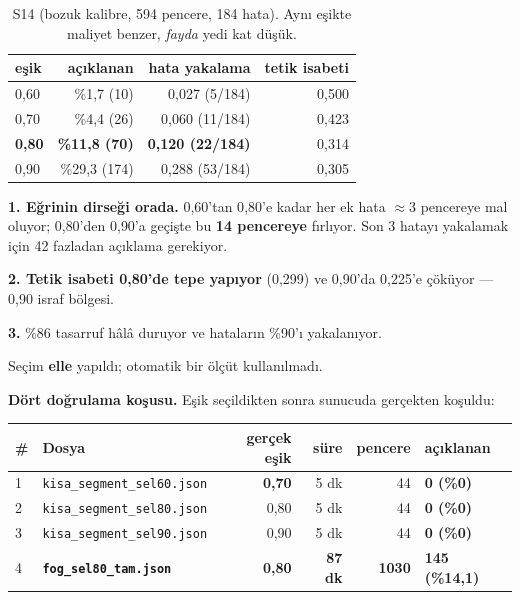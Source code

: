 \documentclass[11pt,a4paper]{article}
\newcommand{\dosya}[1]{\texttt{\footnotesize #1}}
\begin{document}
\begin{table}[H]
\centering\small
\begin{tabular}{@{}lrrr@{}}
\toprule
\textbf{eşik} & \textbf{açıklanan} & \textbf{hata yakalama} & \textbf{tetik isabeti} \\
\midrule
0{,}60 & \%1{,}7 (10) & 0{,}027 (5/184) & 0{,}500 \\
0{,}70 & \%4{,}4 (26) & 0{,}060 (11/184) & 0{,}423 \\
\textbf{0{,}80} & \textbf{\%11{,}8 (70)} & \textbf{0{,}120 (22/184)} & 0{,}314 \\
0{,}90 & \%29{,}3 (174) & 0{,}288 (53/184) & 0{,}305 \\
\bottomrule
\end{tabular}
\caption{S14 (bozuk kalibre, 594 pencere, 184 hata). Aynı eşikte maliyet
benzer, \emph{fayda} yedi kat düşük.}
\end{table}

\begin{bulgu}
\textbf{1. Eğrinin dirseği orada.} 0{,}60'tan 0{,}80'e kadar her ek hata
$\approx$3 pencereye mal oluyor; 0{,}80'den 0{,}90'a geçişte bu \textbf{14
pencereye} fırlıyor. Son 3 hatayı yakalamak için 42 fazladan açıklama gerekiyor.

\textbf{2. Tetik isabeti 0{,}80'de tepe yapıyor} (0{,}299) ve 0{,}90'da
0{,}225'e çöküyor --- 0{,}90 israf bölgesi.

\textbf{3.} \%86 tasarruf hâlâ duruyor ve hataların \%90'ı yakalanıyor.

Seçim \textbf{elle} yapıldı; otomatik bir ölçüt kullanılmadı.
\end{bulgu}

\textbf{Dört doğrulama koşusu.} Eşik seçildikten sonra sunucuda gerçekten
koşuldu:

\begin{table}[H]
\centering\small
\begin{tabular}{@{}llrrrl@{}}
\toprule
\textbf{\#} & \textbf{Dosya} & \textbf{gerçek eşik} & \textbf{süre} & \textbf{pencere} & \textbf{açıklanan} \\
\midrule
1 & \dosya{kisa\_segment\_sel60.json} & \textbf{0{,}70} & 5 dk & 44 & \textbf{0 (\%0)} \\
2 & \dosya{kisa\_segment\_sel80.json} & 0{,}80 & 5 dk & 44 & \textbf{0 (\%0)} \\
3 & \dosya{kisa\_segment\_sel90.json} & 0{,}90 & 5 dk & 44 & \textbf{0 (\%0)} \\
4 & \textbf{\dosya{fog\_sel80\_tam.json}} & \textbf{0{,}80} & \textbf{87 dk} & \textbf{1030} & \textbf{145 (\%14{,}1)} \\
\bottomrule
\end{tabular}
\end{table}
\end{document}
